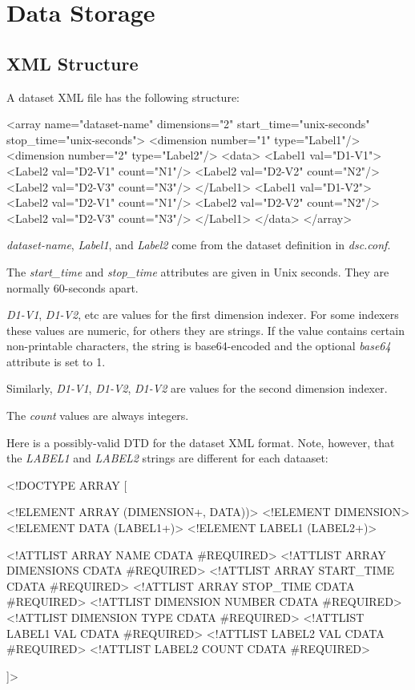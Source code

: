 \documentclass{report}
\begin{document}
\chapter{Data Storage}

\section{XML Structure}

A dataset XML file has the following structure:

\begin{MyVerbatim}
<array name="dataset-name" dimensions="2" start_time="unix-seconds"
        stop_time="unix-seconds">
  <dimension number="1" type="Label1"/>
  <dimension number="2" type="Label2"/>
  <data>
    <Label1 val="D1-V1">
      <Label2 val="D2-V1" count="N1"/>
      <Label2 val="D2-V2" count="N2"/>
      <Label2 val="D2-V3" count="N3"/>
    </Label1>
    <Label1 val="D1-V2">
      <Label2 val="D2-V1" count="N1"/>
      <Label2 val="D2-V2" count="N2"/>
      <Label2 val="D2-V3" count="N3"/>
    </Label1>
  </data>
</array>
\end{MyVerbatim}

\noindent
{\em dataset-name\/},
{\em Label1\/}, and
{\em Label2\/} come from the dataset definition in {\em dsc.conf\/}.

\noindent
The {\em start\_time\/} and {\em stop\_time\/} attributes
are given in Unix seconds.  They are normally 60-seconds apart.

\noindent
{\em D1-V1\/}, {\em D1-V2\/}, etc are values for the
first dimension indexer.  For some indexers these values are
numeric, for others they are strings.  If the value contains
certain non-printable characters, the string is base64-encoded
and the optional {\em base64\/} attribute is set to 1.

\noindent
Similarly, {\em D1-V1\/}, {\em D1-V2\/}, {\em D1-V2\/} are
values for the second dimension indexer.

\noindent
The {\em count\/} values are always integers.

\noindent
Here is a possibly-valid DTD for the dataset XML format.
Note, however, that the {\em LABEL1\/}
and {\em LABEL2\/} strings are different
for each dataaset:

\begin{MyVerbatim}
<!DOCTYPE ARRAY [  

<!ELEMENT ARRAY (DIMENSION+, DATA))>
<!ELEMENT DIMENSION>
<!ELEMENT DATA (LABEL1+)>
<!ELEMENT LABEL1 (LABEL2+)>

<!ATTLIST ARRAY NAME CDATA #REQUIRED>
<!ATTLIST ARRAY DIMENSIONS CDATA #REQUIRED>
<!ATTLIST ARRAY START_TIME CDATA #REQUIRED>
<!ATTLIST ARRAY STOP_TIME CDATA #REQUIRED>
<!ATTLIST DIMENSION NUMBER CDATA #REQUIRED>
<!ATTLIST DIMENSION TYPE CDATA #REQUIRED>
<!ATTLIST LABEL1 VAL CDATA #REQUIRED>
<!ATTLIST LABEL2 VAL CDATA #REQUIRED>
<!ATTLIST LABEL2 COUNT CDATA #REQUIRED>

]> 
\end{MyVerbatim}
\end{document}
